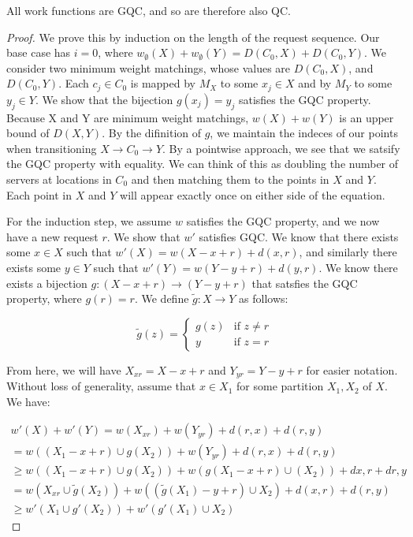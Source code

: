 \begin{lemma}
All work functions are GQC, and so are therefore also QC.
\end{lemma}

\begin{proof}
    We prove this by induction on the length of the request sequence. Our base case has $i = 0$, where $w_{\emptyset}(X) + w_{\emptyset}(Y) = D(C_0, X) + D(C_0, Y)$. We consider two minimum weight matchings, whose values are $D(C_0, X)$, and $D(C_0, Y)$. Each $c_j \in C_0$ is mapped by $M_X$ to some $x_j \in X$ and by $M_Y$ to some $y_j \in Y$. We show that the bijection $g(x_j) = y_j$ satisfies the GQC property. Because X and Y are minimum weight matchings, $w(X) + w(Y)$ is an upper bound of $D(X, Y)$. By the difinition of $g$, we maintain the indeces of our points when transitioning $X \rightarrow C_0 \rightarrow Y$. By a pointwise approach, we see that we satsify the GQC property with equality. We can think of this as doubling the number of servers at locations in $C_0$ and then matching them to the points in $X$ and $Y$. Each point in $X$ and $Y$ will appear exactly once on either side of the equation.

    For the induction step, we assume $w$ satisfies the GQC property, and we now have a new request $r$. We show that $w'$ satisfies GQC. We know that there exists some $x \in X$ such that $w'(X) = w(X-x+r) + d(x,r)$, and similarly there exists some $y \in Y$ such that $w'(Y) = w(Y-y+r) + d(y,r)$. We know there exists a bijection $g: (X-x+r) \rightarrow (Y-y+r)$ that satsfies the GQC property, where $g(r) = r$. We define $\tilde{g}: X \rightarrow Y$ as follows:

    \begin{equation*}
        \tilde{g}(z) = \begin{cases}
            g(z) & \text{if } z \neq r \\
            y & \text{if } z = r
        \end{cases}
    \end{equation*}

    From here, we will have $X_{xr} = X - x + r$ and $Y_{yr} = Y - y + r$ for easier notation. Without loss of generality, assume that $x \in X_1$ for some partition $X_1, X_2$ of $X$. We have:

    \begin{equation*}
        \begin{gathered}
            w'(X) + w'(Y) = w(X_{xr}) + w(Y_{yr}) + d(r, x) + d(r, y) \\
            = w( (X_1-x+r) \cup g(X_2)) + w(Y_{yr}) + d(r, x) + d(r, y) \\
            \geq w((X_1-x+r) \cup g(X_2)) + w(g(X_1-x+r) \cup (X_2)) + d{x, r} + d{r, y} \\
            = w(X_{xr} \cup \tilde{g}(X_2)) + w((\tilde{g}(X_1) -y + r) \cup X_2) + d(x, r) + d(r, y) \\
            \geq w'(X_1 \cup g'(X_2)) + w'(g'(X_1) \cup X_2) 
        \end{gathered}
    \end{equation*}
\end{proof}

